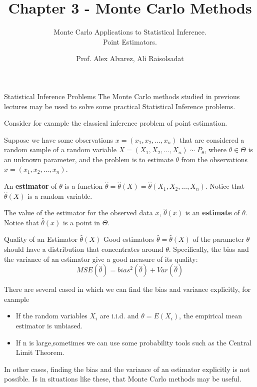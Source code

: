 \documentclass[8pt]{beamer}
\title{Chapter 3 - Monte Carlo Methods}
\subtitle{Monte Carlo Applications to Statistical Inference.\\ Point Estimators.}
\author{Prof. Alex Alvarez, Ali Raisolsadat}
\institute{School of Mathematical and Computational Sciences \\ University of Prince Edward Island}
\date{} %
\begin{document}
\maketitle

\begin{frame}{Statistical Inference Problems}
The Monte Carlo methods studied in previous lectures may be used to solve some practical Statistical Inference problems.

\vspace{2mm}

Consider for example the classical inference problem of point estimation.

\vspace{2mm}

Suppose we have some observations $x=(x_1,x_2,...,x_n)$ that are considered a random sample of a random variable $X=(X_1,X_2,...,X_n)\sim P_{\theta}$, where $\theta \in \Theta$ is an unknown parameter,
and the problem is to estimate  $\theta$ from the observations $x=(x_1,x_2,...,x_n)$.

\vspace{2mm}

An \textbf{estimator} of $\theta$ is a function $\hat{\theta}=\hat{\theta}(X)=\hat{\theta}(X_1,X_2,...,X_n)$. Notice that $\hat{\theta}(X)$ is a random variable.
\vspace{2mm}

The value of the estimator for the observed data $x$, $\hat{\theta}(x)$ is an {\bf estimate} of $\theta$. Notice that $\hat{\theta}(x)$ is a point in $\Theta$.
\end{frame}

\begin{frame}{Quality of an Estimator $\hat{\theta}(X)$}
Good estimators $\hat{\theta}=\hat{\theta}(X)$ of the parameter $\theta$ should have a distribution that concentrates around $\theta$.
Specifically, the bias and the variance of an estimator give a good measure of its quality:
\begin{equation*}
	MSE (\hat{\theta}) = bias^2(\hat{\theta}) + Var(\hat{\theta})
\end{equation*}

There are several cased in which we can find the bias and variance explicitly, for example

\begin{itemize}
	\item If the random variables $X_i$ are i.i.d. and $\theta=E(X_i)$, the empirical mean estimator is unbiased.
	\item If n is large,sometimes we can use some probability tools such as the Central Limit Theorem.
\end{itemize}

In other cases, finding the bias and the variance of an estimator explicitly is not possible. Is in situations like these, that Monte Carlo methods may be useful.
\end{frame}
\end{document}
